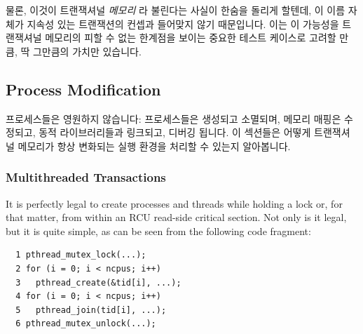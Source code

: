 물론, 이것이 트랜잭셔널 \emph{메모리} 라 불린다는 사실이 한숨을 돌리게 할텐데,
이 이름 자체가 지속성 있는 트랜잭션의 컨셉과 들어맞지 않기 때문입니다.
이는 이 가능성을 트랜잭셔널 메모리의 피할 수 없는 한계점을 보이는 중요한 테스트
케이스로 고려할 만큼, 딱 그만큼의 가치만 있습니다.

\subsection{Process Modification}
\label{sec:future:Process Modification}

프로세스들은 영원하지 않습니다:
프로세스들은 생성되고 소멸되며, 메모리 매핑은 수정되고, 동적 라이브러리들과
링크되고, 디버깅 됩니다.
이 섹션들은 어떻게 트랜잭셔널 메모리가 항상 변화되는 실행 환경을 처리할 수
있는지 알아봅니다.

\subsubsection{Multithreaded Transactions}
\label{sec:future:Multithreaded Transactions}

It is perfectly legal to create processes and threads while holding
a lock or, for that matter, from within an RCU read-side critical
section.
Not only is it legal, but it is quite simple, as can be seen from the
following code fragment:

\vspace{5pt}
\begin{minipage}[t]{\columnwidth}
\small
\begin{verbatim}
  1 pthread_mutex_lock(...);
  2 for (i = 0; i < ncpus; i++)
  3   pthread_create(&tid[i], ...);
  4 for (i = 0; i < ncpus; i++)
  5   pthread_join(tid[i], ...);
  6 pthread_mutex_unlock(...);
\end{verbatim}
\end{minipage}
\vspace{5pt}

